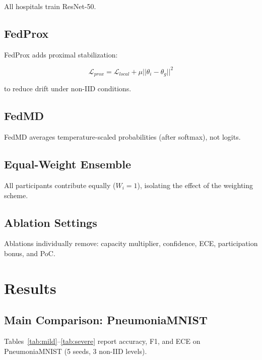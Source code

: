\documentclass[conference]{IEEEtran}
\begin{document}
All hospitals train ResNet-50.

\subsection{FedProx}

FedProx adds proximal stabilization:

\begin{equation}
\mathcal{L}_{prox} = \mathcal{L}_{local} + \mu ||\theta_i-\theta_g||^2
\end{equation}

to reduce drift under non-IID conditions.

\subsection{FedMD}

FedMD averages temperature-scaled probabilities (after softmax), not logits.

\subsection{Equal-Weight Ensemble}

All participants contribute equally ($W_i = 1$), isolating the effect of the weighting scheme.

\subsection{Ablation Settings}

Ablations individually remove: capacity multiplier, confidence, ECE, participation bonus, and PoC.

\section{Results}

\subsection{Main Comparison: PneumoniaMNIST}

Tables~\ref{tab:mild}--\ref{tab:severe} report accuracy, F1, and ECE on PneumoniaMNIST (5 seeds, 3 non-IID levels).
\end{document}
